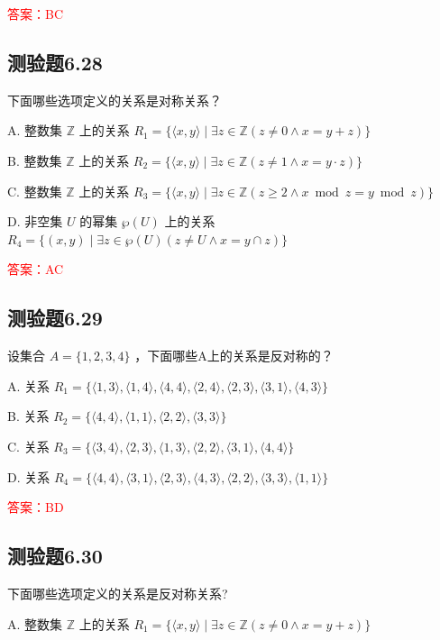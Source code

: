 \documentclass[UTF8, heading=true]{ctexart}
\begin{document}
\textcolor{red}{答案：BC}

\subsection{测验题6.28}

下面哪些选项定义的关系是对称关系？

A. 整数集 $\mathbb{Z}$ 上的关系 $R_1=\{\langle x, y\rangle \mid \exists z \in \mathbb{Z}(z \neq 0 \wedge x=y+z)\}$

B. 整数集 $\mathbb{Z}$ 上的关系 $R_2=\{\langle x, y\rangle \mid \exists z \in \mathbb{Z}(z \neq 1 \wedge x=y \cdot z)\}$

C. 整数集 $\mathbb{Z}$ 上的关系 $R_3=\{\langle x, y\rangle \mid \exists z \in \mathbb{Z}(z \geq 2 \wedge x \bmod z=y \bmod z)\}$

D. 非空集 $U$ 的幂集 $\wp(U)$ 上的关系 $R_4=\{(x, y) \mid \exists z \in \wp(U)(z \neq U \wedge x=y \cap z)\}$

\textcolor{red}{答案：AC}

\subsection{测验题6.29}


设集合 $A=\{1,2,3,4\}$ ，下面哪些A上的关系是反对称的？

A. 关系 $R_1 = \{\langle 1,3\rangle, \langle 1,4\rangle, \langle 4,4\rangle, \langle 2,4\rangle, \langle 2,3\rangle, \langle 3,1\rangle, \langle 4,3\rangle\}$

B. 关系 $R_2 = \{\langle 4,4\rangle, \langle 1,1\rangle, \langle 2,2\rangle, \langle 3,3\rangle\}$

C. 关系 $R_3 = \{\langle 3,4\rangle, \langle 2,3\rangle, \langle 1,3\rangle, \langle 2,2\rangle, \langle 3,1\rangle, \langle 4,4\rangle\}$

D. 关系 $R_4 = \{\langle 4,4\rangle, \langle 3,1\rangle, \langle 2,3\rangle, \langle 4,3\rangle, \langle 2,2\rangle, \langle 3,3\rangle, \langle 1,1\rangle\}$


\textcolor{red}{答案：BD}

\subsection{测验题6.30}

下面哪些选项定义的关系是反对称关系?

A. 整数集 $\mathbb{Z}$ 上的关系 $R_1=\{\langle x, y\rangle \mid \exists z \in \mathbb{Z}(z \neq 0 \wedge x=y+z)\}$
\end{document}
